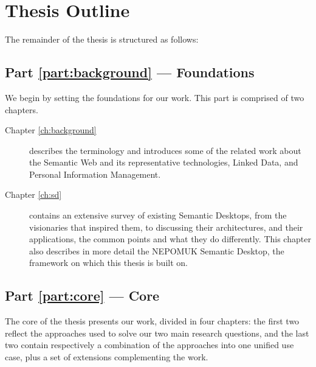 \section{Thesis Outline}
\label{sec:outline}

The remainder of the thesis is structured as follows: 

\subsection*{Part \ref{part:background} --- Foundations}

We begin by setting the foundations for our work. This part is comprised of two chapters. 

\begin{description}
\item[Chapter \ref{ch:background}] describes the terminology and introduces some of the related work about the Semantic Web and its representative technologies, Linked Data, and Personal Information Management.
\item[Chapter \ref{ch:sd}] contains an extensive survey of existing Semantic Desktops, from the visionaries that inspired them, to discussing their architectures, and their applications, the common points and what they do differently. This chapter also describes in more detail the NEPOMUK Semantic Desktop, the framework on which this thesis is built on.
\end{description}

\subsection*{Part \ref{part:core} --- Core}

The core of the thesis presents our work, divided in four chapters: the first two reflect the approaches used to solve our two main research questions, and the last two contain respectively a combination of the approaches into one unified use case, plus a set of extensions complementing the work.

